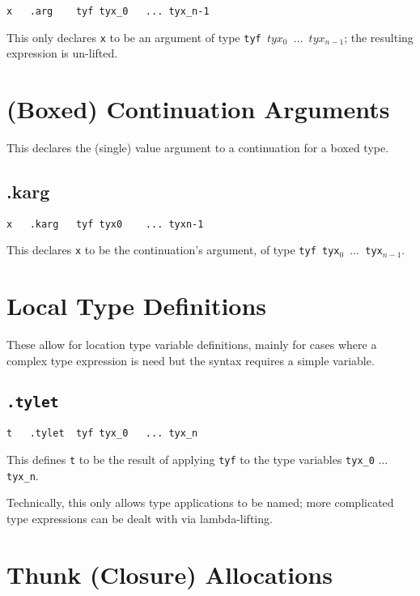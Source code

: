 \documentclass{report}
\newcommand\stringcode[1]{\texttt{#1}}
\begin{document}
\begin{verbatim}
x	.arg	tyf	tyx_0	...	tyx_n-1
\end{verbatim}

This only declares \stringcode{x} to be an argument of type \stringcode{tyf $tyx_0$ $\ldots$ $tyx_{n-1}$};
the resulting expression is un-lifted.

\section{(Boxed) Continuation Arguments}
\label{cont_arg}

This declares the (single) value argument to a continuation for a boxed type.

\subsection{.karg}

\begin{verbatim}
x	.karg	tyf	tyx0	...	tyxn-1
\end{verbatim}

This declares \stringcode{x} to be the continuation's argument, of type \stringcode{tyf tyx$_0$ $\ldots$ tyx$_{n-1}$}.

\section{Local Type Definitions}
\label{code_type_let}

These allow for location type variable definitions,
mainly for cases where a complex type expression is need but the syntax requires a simple variable.

\subsection{\stringcode{.tylet}}

\begin{verbatim}
t	.tylet	tyf	tyx_0	...	tyx_n
\end{verbatim}

This defines \stringcode{t} to be the result of applying \stringcode{tyf} to the type variables \stringcode{tyx\_0} $\ldots$ \stringcode{tyx\_n}.

Technically, this only allows type applications to be named;
more complicated type expressions can be dealt with via lambda-lifting.

\section{Thunk (Closure) Allocations}
\label{thunk_alloc}
\end{document}
